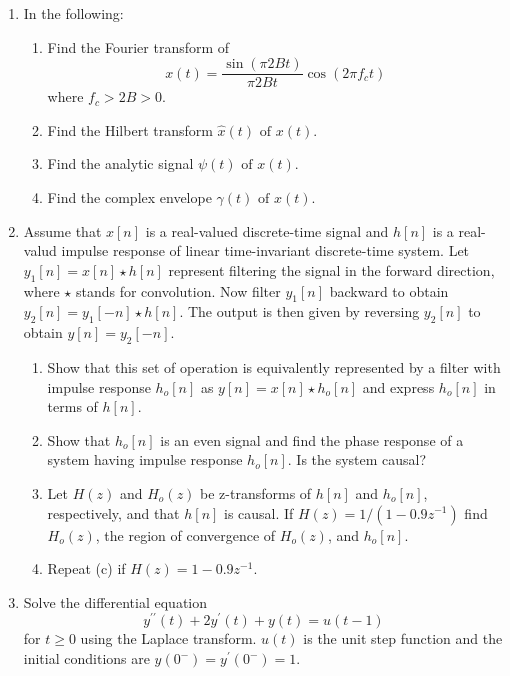 \documentclass[main.tex]{subfiles}
\begin{document}
\begin{enumerate}
\item In the following:

    \begin{enumerate}
        \item Find the Fourier transform of 
        $$x(t)=\frac{\sin (\pi 2 B t)}{\pi 2 B t} \cos \left(2 \pi f_{c} t\right)$$
        where $f_{c}>2 B>0$.
        \item Find the Hilbert transform $\hat{x}(t) \text { of } x(t)$.
        \item Find the analytic signal $\psi(t) \text { of } x(t)$.
        \item Find the complex envelope $\gamma(t) \text { of } x(t)$.
    \end{enumerate}
    
\item Assume that $x[n]$ is a real-valued discrete-time signal and $h[n]$ is a real-valud impulse response of linear time-invariant discrete-time system. Let $y_{1}[n]=x[n] \star h[n]$ represent filtering the signal in the forward direction, where $\star$ stands for convolution. Now filter $y_{1}[n]$ backward to obtain $y_{2}[n]=y_{1}[-n] \star h[n]$. The output is then given by reversing $y_{2}[n]$ to obtain $y[n]=y_{2}[-n]$.

    \begin{enumerate}
        \item Show that this set of operation is equivalently represented by a filter with impulse response $h_{o}[n]$ as $y[n]=x[n] \star h_{o}[n]$ and express $h_{o}[n]$ in terms of $h[n]$.
        \item Show that $h_{o}[n]$ is an even signal and find the phase response of a system having impulse response $h_{o}[n]$. Is the system causal?
        \item Let $H(z)$ and $H_{o}(z)$ be z-transforms of $h[n]$ and $h_{o}[n]$, respectively, and that $h[n]$ is causal. If $H(z)=1 /\left(1-0.9 z^{-1}\right)$ find $H_{o}(z)$, the region of convergence of $H_{o}(z)$, and $h_{o}[n]$.
        \item Repeat (c) if $H(z)=1-0.9 z^{-1}$.
    \end{enumerate}
    
\item Solve the differential equation
    $$y^{\prime \prime}(t)+2 y^{\prime}(t)+y(t)=u(t-1)$$
for $t \geq 0$ using the Laplace transform. $u(t)$ is the unit step function and the initial conditions are $y\left(0^{-}\right)=y^{\prime}\left(0^{-}\right)=1$.


\end{enumerate}
\end{document}
